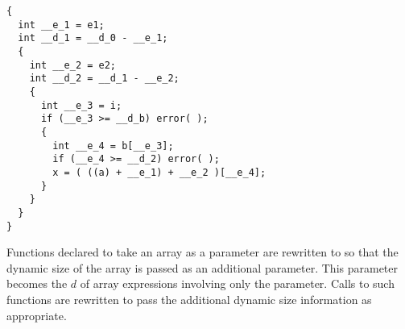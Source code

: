 \singlespace
\begin{lstlisting}[language=nesC]
{
  int __e_1 = e1;
  int __d_1 = __d_0 - __e_1;
  {
    int __e_2 = e2;
    int __d_2 = __d_1 - __e_2;
    {
      int __e_3 = i;
      if (__e_3 >= __d_b) error( );
      {
        int __e_4 = b[__e_3];
        if (__e_4 >= __d_2) error( );
        x = ( ((a) + __e_1) + __e_2 )[__e_4];
      }
    }
  }
}
\end{lstlisting}
\primaryspacing


Functions declared to take an array as a parameter are rewritten to so that the dynamic size of
the array is passed as an additional parameter. This parameter becomes the $d$ of array
expressions involving only the parameter. Calls to such functions are rewritten to pass the
additional dynamic size information as appropriate.

